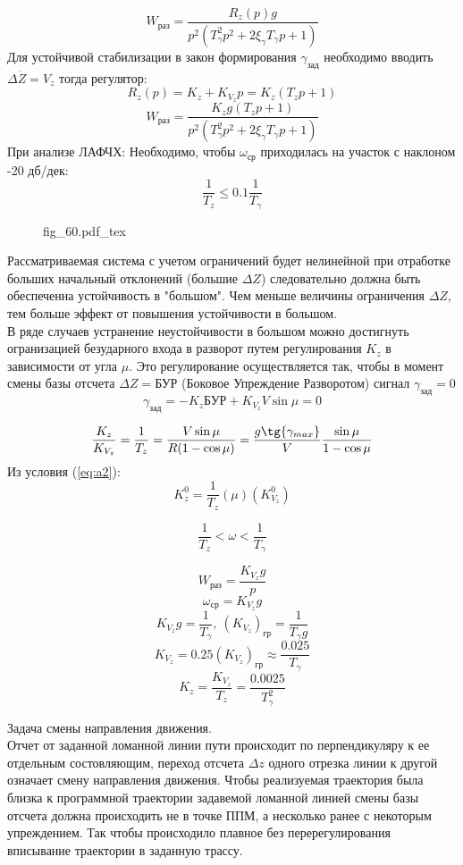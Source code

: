 \documentclass{article}
\newcommand{\incfig}[1]{
    {#1.pdf_tex}
}
\begin{document}
\[
	W_\text{раз} = \frac{R_z(p)g}{p^2(T_\gamma^2 p^2 + 2 \xi_\gamma T_\gamma p + 1)}
\]
Для устойчивой стабилизации в закон формирования $\gamma_\text{зад}$ необходимо вводить $\Delta \dot{Z} = V_{z}$ тогда регулятор:
\[
	R_z(p) = K_z + K_{V_z} p = K_z(T_z p +1)
\]
\[
	W_\text{раз} = \frac{K_z g(T_z p + 1)}{p^2(T_\gamma^2 p^2 + 2 \xi_\gamma T_\gamma p + 1)}
\]
При анализе ЛАФЧХ: 
Необходимо, чтобы $ \omega_\text{ср}$ приходилась на участок с наклоном -20 дб/дек:
\begin{equation}
	\frac{1}{T_z} \le 0.1 \frac{1}{T_\gamma}
	\label{eq:a2}
\end{equation}

\begin{figure}[H]
	\centering
	\incfig{fig_60}
	\label{fig:fig_60}
\end{figure}

Рассматриваемая система с учетом ограничений будет нелинейной при отработке больших начальный отклонений (большие $\Delta Z$) следовательно должна быть обеспеченна устойчивость в "большом". 
Чем меньше величины ограничения $\Delta Z$, тем больше эффект от повышения устойчивости в большом.\\
В ряде случаев устранение неустойчивости в большом можно достигнуть огранизацией безударного входа в разворот путем регулирования $K_z$ в зависимости от угла $\mu$.
Это регулирование осуществляется так, чтобы в момент смены базы отсчета $\Delta Z = \text{БУР}$ (Боковое Упреждение Разворотом) сигнал $ \gamma_\text{зад} =  0$
\[
	\gamma_\text{зад} = -K_z \text{БУР} + K_{V_z} V \sin{\mu} = 0
\]

\[
	\frac{K_z}{K_{V_z}} = \frac{1}{T_z} = \frac{V \sin{\mu}}{R( 1 - \cos{\mu})} = \frac{g \tg{\gamma_{max}}}{V} \frac{\sin{\mu}}{1 - \cos{\mu}}
\]
Из условия (\ref{eq:a2}):
\[
	K_z^0 = \frac{1}{T_z}(\mu)(K_{V_z}^0)
\]

\[
	\frac{1}{T_z} < \omega < \frac{1}{T_\gamma}
\]

\[
	W_\text{раз} = \frac{K_{V_z} g}{p}
\]
\[
	\omega_\text{ср} = K_{V_z} g
\]
\[
	K_{V_z} g = \frac{1}{T_\gamma} , \ (K_{V_z})_\text{гр} = \frac{1}{T_\gamma g}
\]
\[
	K_{V_z} = 0.25(K_{V_z})_\text{гр} \approx \frac{0.025}{T_{\gamma}}
\]
\[
	K_z = \frac{K_{V_z}}{T_z} = \frac{0.0025}{T_\gamma^2}
\]

Задача смены направления движения.\\
Отчет от заданной ломанной линии пути происходит по перпендикуляру к ее отдельным состовляющим, переход отсчета $\Delta z$ одного отрезка линии к другой означает смену направления движения. Чтобы реализуемая траектория была близка к программной траектории задавемой ломанной линией смены базы отсчета должна происходить не в точке ППМ, а несколько ранее с некоторым упреждением. Так чтобы происходило плавное без перерегулирования вписывание траектории в заданную трассу.\\
\end{document}
